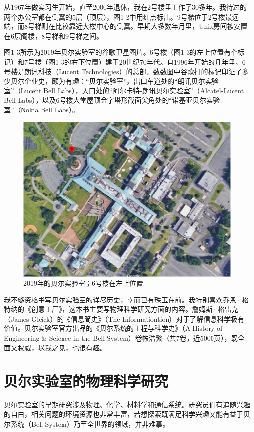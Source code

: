 \documentclass[a4paper,12pt,UTF8,twoside]{ctexbook}
\begin{document}
从1967年做实习生开始，直至2000年退休，我在2号楼里工作了30多年。我待过的两个办公室都在侧翼的5层（顶层），图1-2中用红点标出。9号梯位于2号楼最远端，而8号梯则在比较靠近大楼中心的侧翼。早期大多数年月里，Unix房间被安置在6层阁楼，8号梯和9号梯之间。

图1-3所示为2019年贝尔实验室的谷歌卫星图片。6号楼（图1-3的左上位置有个标记）和7号楼（图1-3的右下位置）建于20世纪70年代。自1996年开始的几年里，6号楼是朗讯科技（Lucent Technologies）的总部。数数图中谷歌打的标记印证了多少贝尔企业史，颇为有趣：“贝尔实验室”，出口车道处的“朗讯贝尔实验室”（Lucent Bell Labs），入口处的“阿尔卡特-朗讯贝尔实验室”（Alcatel-Lucent Bell Labs），以及6号楼大堂屋顶金字塔形截面尖角处的“诺基亚贝尔实验室”（Nokia Bell Labs）。

\begin{figure}[htbp]
	\centering
	\includegraphics[width=0.7\linewidth]{3}
	\caption{2019年的贝尔实验室；6号楼在左上位置}
	\label{fig:1}
\end{figure}

我不够资格书写贝尔实验室的详尽历史，幸而已有珠玉在前。我特别喜欢乔恩·格特纳的《创意工厂》，这本书主要写物理科学研究方面的内容。詹姆斯·格雷克（James Gleick）的《信息简史》（The Informationtion）对于了解信息科学极有价值。贝尔实验室官方出品的《贝尔系统的工程与科学史》（A History of Engineering \& Science in the Bell System）卷帙浩繁（共7卷，近5000页），既全面又权威，以我之见，也很有趣。

\section{贝尔实验室的物理科学研究}

贝尔实验室的早期研究涉及物理、化学、材料学和通信系统。研究员们有追随兴趣的自由，相关问题的环境资源也非常丰富，若想探索既满足科学兴趣又能有益于贝尔系统（Bell System）乃至全世界的领域，并非难事。
\end{document}
